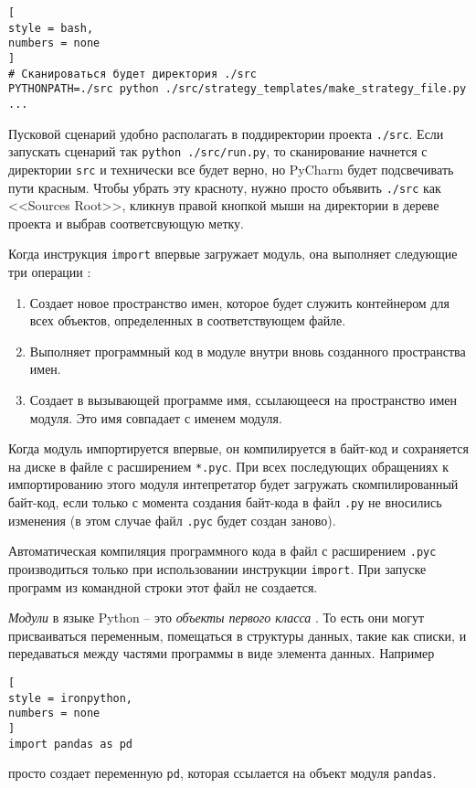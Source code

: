 \documentclass[%
	11pt,
	a4paper,
	utf8,
		]{article}
\begin{document}
\begin{lstlisting}[
style = bash,
numbers = none
]
# Сканироваться будет директория ./src
PYTHONPATH=./src python ./src/strategy_templates/make_strategy_file.py ...
\end{lstlisting}

Пусковой сценарий удобно располагать в поддиректории проекта \verb|./src|. Если запускать сценарий так \verb|python ./src/run.py|, то сканирование начнется с директории \verb|src| и технически все будет верно, но PyCharm будет подсвечивать пути красным. Чтобы убрать эту красноту, нужно просто объявить \verb|./src| как <<Sources Root>>, кликнув правой кнопкой мыши на директории в дереве проекта и выбрав соответсвующую метку.

Когда инструкция \texttt{import} впервые загружает модуль, она выполняет следующие три операции \cite[]{beazley:python-2010}:
\begin{enumerate}
	\item Создает новое пространство имен, которое будет служить контейнером для всех объектов, определенных в соответствующем файле.
	
	\item Выполняет программный код в модуле внутри вновь созданного пространства имен.
	
	\item Создает в вызывающей программе имя, ссылающееся на пространство имен модуля. Это имя совпадает с именем модуля.
\end{enumerate}

Когда модуль импортируется впервые, он компилируется в байт-код и сохраняется на диске в файле с расширением \texttt{*.pyc}. При всех последующих обращениях к импортированию этого модуля интепретатор будет загружать скомпилированный байт-код, если только с момента создания байт-кода в файл \texttt{.py} не вносились изменения (в этом случае файл \texttt{.pyc} будет создан заново).

Автоматическая компиляция программного кода в файл с расширением \texttt{.pyc} производиться только при использовании инструкции \texttt{import}. При запуске программ из командной строки этот файл не создается.

\emph{Модули} в языке Python -- это \emph{объекты первого класса} \cite[]{beazley:python-2010}. То есть они могут присваиваться переменным, помещаться в структуры данных, такие как списки, и передаваться между частями программы в виде элемента данных. Например
\begin{lstlisting}[
style = ironpython,
numbers = none	
]
import pandas as pd
\end{lstlisting}
просто создает переменную \texttt{pd}, которая ссылается на объект модуля \texttt{pandas}.
\end{document}
